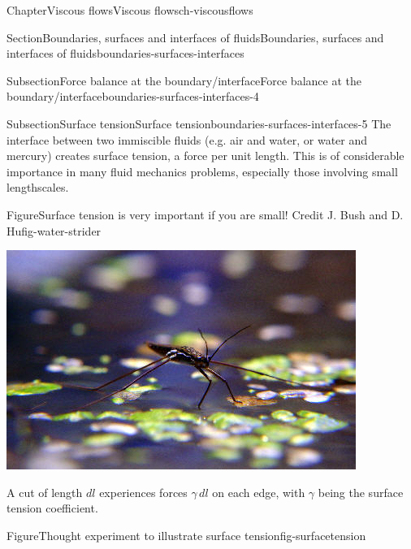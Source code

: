 \documentclass[oneside,10pt,]{book}
\numberwithin{equation}{section}
\begin{document}
\begin{chapterptx}{Chapter}{Viscous flows}{}{Viscous flows}{}{}{ch-viscousflows}
\begin{sectionptx}{Section}{Boundaries, surfaces and interfaces of fluids}{}{Boundaries, surfaces and interfaces of fluids}{}{}{boundaries-surfaces-interfaces}
\begin{subsectionptx}{Subsection}{Force balance at the boundary\slash{}interface}{}{Force balance at the boundary\slash{}interface}{}{}{boundaries-surfaces-interfaces-4}
\end{subsectionptx}
%
%
\typeout{************************************************}
\typeout{************************************************}
%
\begin{subsectionptx}{Subsection}{Surface tension}{}{Surface tension}{}{}{boundaries-surfaces-interfaces-5}
The interface between two immiscible fluids (e.g. air and water, or water and mercury) creates surface tension, a force per unit length. This is of considerable importance in many fluid mechanics problems, especially those involving small lengthscales.%
\begin{figureptx}{Figure}{Surface tension is very important if you are small! Credit J. Bush and D. Hu}{fig-water-strider}{}%
\begin{image}{0.25}{0.5}{0.25}{}%
\includegraphics[width=\linewidth]{external/ch-chapter07-waterstrider-J-Bush-and-D-Hu.jpg}
\end{image}%
\tcblower
\end{figureptx}%
A cut of length \(dl\) experiences forces \(\gamma\,dl\) on each edge, with \(\gamma\) being the surface tension coefficient.%
\begin{figureptx}{Figure}{Thought experiment to illustrate surface tension}{fig-surfacetension}{}%
\begin{image}{0.25}{0.5}{0.25}{}%

\end{image}
\end{figureptx}
\end{subsectionptx}
\end{sectionptx}
\end{chapterptx}
\end{document}
